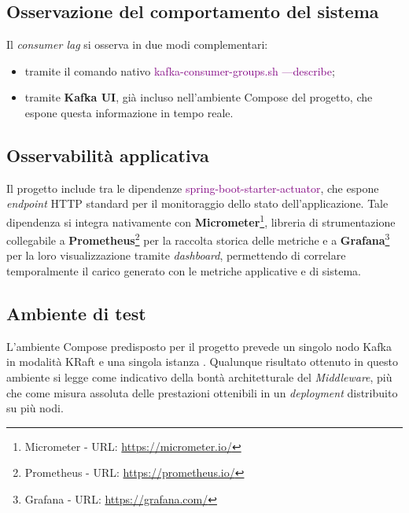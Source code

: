 \newpage
\subsection{Osservazione del comportamento del sistema}
Il \textit{consumer lag} si osserva in due modi complementari: 
\begin{itemize}
    \item tramite il comando nativo \textcolor{purple}{kafka-consumer-groups.sh —describe}; 
    \item tramite \textbf{Kafka UI}, già incluso nell'ambiente  Compose del progetto, che espone questa informazione in tempo reale.
\end{itemize}

\subsection{Osservabilità applicativa}
Il progetto include tra le dipendenze  \textcolor{purple}{spring-boot-starter-actuator}, che espone \textit{endpoint} \acrshort{HTTP} standard per il monitoraggio dello stato dell'applicazione. 
Tale dipendenza si integra nativamente con \textbf{Micrometer}\footnote{Micrometer - URL: \url{https://micrometer.io/}}, libreria di strumentazione collegabile a \textbf{Prometheus}\footnote{Prometheus - URL: \url{https://prometheus.io/}} per la raccolta storica delle metriche e a \textbf{Grafana}\footnote{Grafana - URL: \url{https://grafana.com/}} per la loro visualizzazione tramite \textit{dashboard}, permettendo di correlare temporalmente il carico generato con le metriche applicative e di sistema.

\subsection{Ambiente di test}
L'ambiente  Compose predisposto per il progetto prevede un singolo nodo Kafka in modalità \gls{KRaft} e una singola istanza . 
Qualunque risultato ottenuto in questo ambiente si legge come indicativo della bontà architetturale del \textit{Middleware}, più che come misura assoluta delle prestazioni ottenibili in un \textit{deployment} distribuito su più nodi.

\newpage

